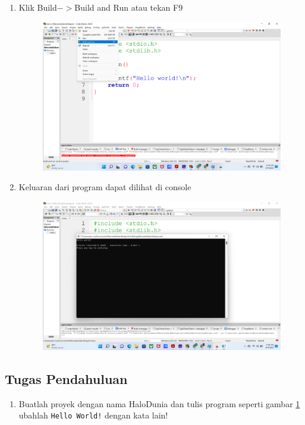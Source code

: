 \begin{enumerate}
\begin{figure}[H]
	\caption{}
	\label{fig:screenshot008}
\end{figure}
\item Klik Build$->$Build and Run atau tekan F9
\begin{figure}[H]
	\centering
	\includegraphics[width=0.7\linewidth]{../P1/img/screenshot009.png}
	\caption{}
	\label{fig:screenshot009}
\end{figure}
\item Keluaran dari program dapat dilihat di console
\begin{figure}[H]
	\centering
	\includegraphics[width=0.7\linewidth]{../P1/img/screenshot010.png}
	\caption{}
	\label{fig:screenshot010}
\end{figure}
\end{enumerate}

\subsection{Tugas Pendahuluan}
\begin{enumerate}
	\item Buatlah proyek dengan nama HaloDunia dan tulis program seperti gambar \ref{fig:screenshot008} ubahlah \verb|Hello World!| dengan kata lain!
\end{enumerate}

